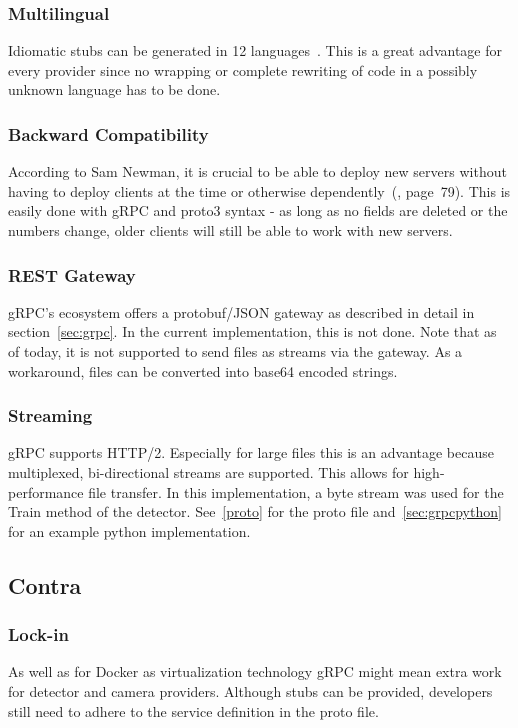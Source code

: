 \subsubsection{Multilingual}
Idiomatic stubs can be generated in 12 languages~\cite{gRPC-Documentation2019Last2019}. This is a great advantage for every provider since no wrapping or complete rewriting of code in a possibly unknown language has to be done.
\subsubsection{Backward Compatibility}
According to Sam Newman, it is crucial to be able to deploy new servers without having to deploy clients at the time or otherwise dependently~(\cite{Newman2015BuildingMicroservices}, page~79). This is easily done with gRPC and proto3 syntax - as long as no fields are deleted or the numbers change, older clients will still be able to work with new servers.
\subsubsection{REST Gateway}
gRPC's ecosystem offers a protobuf/JSON gateway as described in detail in section~\ref{sec:grpc}. In the current implementation, this is not done. Note that as of today, it is not supported to send files as streams via the gateway. As a workaround, files can be converted into base64 encoded strings. 
\subsubsection{Streaming}
gRPC supports HTTP/2. Especially for large files this is an advantage because multiplexed, bi-directional streams are supported. This allows for high-performance file transfer. In this implementation, a byte stream was used for the Train method of the detector. See~\ref{proto} for the proto file and~\ref{sec:grpcpython} for an example python implementation.

\subsection{Contra}
\subsubsection{Lock-in}
As well as for Docker as virtualization technology gRPC might mean extra work for detector and camera providers. Although stubs can be provided, developers still need to adhere to the service definition in the proto file.

